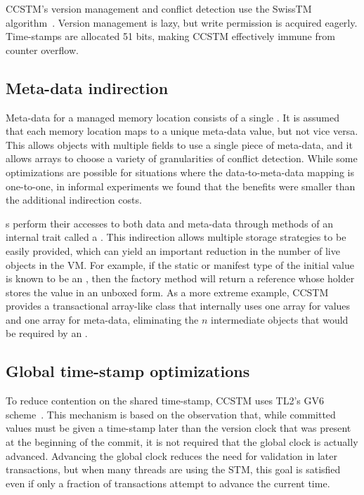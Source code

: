 
CCSTM's version management and conflict detection use the SwissTM
algorithm~\cite{dragojevic09swisstm}.  Version management is lazy, but
write permission is acquired eagerly.  Time-stamps are allocated 51 bits,
making CCSTM effectively immune from counter overflow.

\subsection{Meta-data indirection}

Meta-data for a managed memory location consists of a single .
It is assumed that each memory location maps to a unique meta-data value, but
not vice versa.  This allows objects with multiple fields to use
a single piece of meta-data, and it allows arrays to choose a variety of
granularities of conflict detection.  While some optimizations are possible for
situations where the data-to-meta-data mapping is one-to-one, in informal
experiments we found that the benefits were smaller than the additional
indirection costs.

s perform their accesses to both data and meta-data through
methods of an internal trait called a .  This indirection
allows multiple storage strategies to be easily provided, which can
yield an important reduction in the number of live objects in the VM.
For example, if the static or manifest type of the initial value is known
to be an , then the  factory method will return
a reference whose holder stores the value in an unboxed form.  As a
more extreme example, CCSTM provides a transactional array-like class
that internally uses one array for values and one array for meta-data,
eliminating the $n$ intermediate objects that would be required by an
.

\subsection{Global time-stamp optimizations}

To reduce contention on the shared time-stamp, CCSTM uses TL2's GV6
scheme~\cite{dice06tl2}.  This mechanism is based on the observation
that, while committed values must be given a time-stamp later than the
version clock that was present at the beginning of the commit, it is
not required that the global clock is actually advanced.  Advancing the
global clock reduces the need for validation in later transactions,
but when many threads are using the STM, this goal is satisfied even if
only a fraction of transactions attempt to advance the current time.

